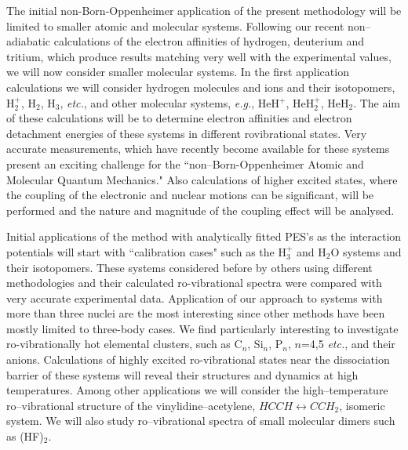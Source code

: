 The initial non-Born-Oppenheimer 
application of the present methodology 
will be limited
to smaller atomic and molecular systems.
Following our recent non--adiabatic calculations
of the electron affinities of hydrogen, deuterium and tritium,
which produce results matching very well with the experimental
values, we will now consider smaller molecular systems.
In the first application calculations 
we will consider
hydrogen molecules and ions and their isotopomers,
H$_2^+$, H$_2$, H$_3$, {\it etc.}, 
and other molecular systems, {\it e.g.}, HeH$^+$, HeH$_2^+$, HeH$_2$.
The aim of these calculations will be to determine 
electron affinities and electron detachment energies 
of these systems in different rovibrational states.
Very accurate measurements, which have 
recently become
available 
for these systems
present an exciting challenge for 
the ``non--Born-Oppenheimer Atomic and Molecular Quantum Mechanics."
Also calculations of 
higher excited states,
where the coupling of the electronic and nuclear motions
can be significant, 
will be performed and the nature and magnitude of the 
coupling effect will be 
analysed.

Initial applications of the method with 
analytically fitted PES's as the 
interaction potentials
will start with 
``calibration cases"
such as the H$_3^+$ and H$_2$O systems and their 
isotopomers.
These systems considered before by others
using different methodologies
and their calculated ro-vibrational spectra 
were compared with very accurate experimental data.
Application of our approach to systems with more than three
nuclei are the most interesting since 
other methods have been mostly limited to three-body cases.
We find particularly interesting to investigate 
ro-vibrationally hot elemental clusters, such as
C$_n$, Si$_n$, P$_n$, $n$=4,5 {\it etc.}, and their anions.
Calculations of highly excited ro-vibrational states near the
dissociation barrier of
these systems will reveal their structures and dynamics 
at high temperatures.
Among other applications we will consider
the high--temperature
ro--vibrational structure  
of the vinylidine--acetylene,
$HCCH \leftrightarrow CCH_2$, isomeric system.
We will also study
ro--vibrational spectra 
of small molecular dimers such
as (HF)$_2$.

